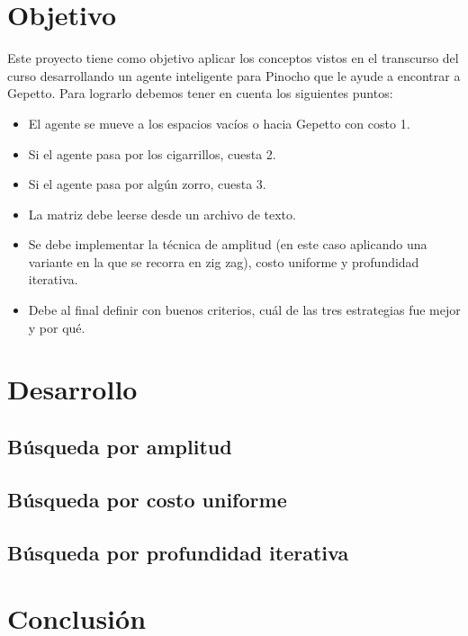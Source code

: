 \documentclass[12pt, letterpaper]{article}
\begin{document}
\section{Objetivo}
Este proyecto tiene como objetivo aplicar los conceptos vistos en el transcurso del curso desarrollando un agente inteligente para Pinocho que le ayude a encontrar a Gepetto. Para lograrlo debemos tener en cuenta los siguientes puntos:
\begin{itemize}
    \item El agente se mueve a los espacios vacíos o hacia Gepetto con costo 1.
    \item Si el agente pasa por los cigarrillos, cuesta 2.
    \item Si el agente pasa por algún zorro, cuesta 3.
    \item La matriz debe leerse desde un archivo de texto.
    \item Se debe implementar la técnica de amplitud (en este caso aplicando una variante en la que se recorra en zig zag), costo uniforme y profundidad iterativa.
    \item Debe al final definir con buenos criterios, cuál de las tres estrategias fue mejor y por qué.
\end{itemize}
\clearpage
\section{Desarrollo}

\subsection{Búsqueda por amplitud}

\subsection{Búsqueda por costo uniforme}

\subsection{Búsqueda por profundidad iterativa}

\section{Conclusión}
\clearpage
\end{document}
